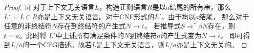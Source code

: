 \begin{proof}
    b)
    对于上下文无关语言$L$，构造正则语言$R$是以$a$结尾的所有串，那么
    $L' = L\cap R$亦是上下文无关语言。对于CNF形式的$L'$，由于均以$a$结尾，
    那么对于任意的非终结符$N$存在到终结符的产生式$N\rightarrow t$，
    若推导式$S\Rightarrow^{*} \beta N$存在，则$t=a$。此时将
    $L'$中上述所有满足条件的$N$到终结符$a$的产生式变为$N\rightarrow \epsilon$，
    即可得到$L/a$的一个CFG描述。故若$L$是上下文无关语言，则$L/a$亦是上下文无关的。
\end{proof}